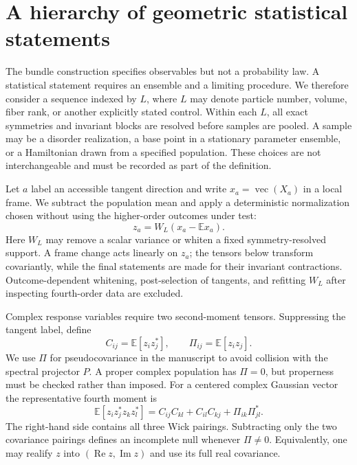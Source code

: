 \section{A hierarchy of geometric statistical statements}
\label{sec:geometric_eth_ansatz}

The bundle construction specifies observables but not a probability law.  A
statistical statement requires an ensemble and a limiting procedure.  We
therefore consider a sequence indexed by $L$, where $L$ may denote particle
number, volume, fiber rank, or another explicitly stated control.  Within
each $L$, all exact symmetries and invariant blocks are resolved before
samples are pooled.  A sample may be a disorder realization, a base point in
a stationary parameter ensemble, or a Hamiltonian drawn from a specified
population.  These choices are not interchangeable and must be recorded as
part of the definition.

Let $a$ label an accessible tangent direction and write
$x_a=\operatorname{vec}(X_a)$ in a local frame.  We subtract the population
mean and apply a deterministic normalization chosen without using the
higher-order outcomes under test:
\begin{equation}
 z_a=W_L\left(x_a-\mathbb E x_a\right).
 \label{eq:normalized_response}
\end{equation}
Here $W_L$ may remove a scalar variance or whiten a fixed symmetry-resolved
support.  A frame change acts linearly on $z_a$; the tensors below transform
covariantly, while the final statements are made for their invariant
contractions.  Outcome-dependent whitening, post-selection of tangents, and
refitting $W_L$ after inspecting fourth-order data are excluded.

Complex response variables require two second-moment tensors.  Suppressing
the tangent label, define
\begin{equation}
 C_{ij}=\mathbb E[z_i z_j^*],
 \qquad
 \Pi_{ij}=\mathbb E[z_i z_j].
 \label{eq:covariance_pseudocovariance}
\end{equation}
We use $\Pi$ for pseudocovariance in the manuscript to avoid collision with
the spectral projector $P$.  A proper complex population has $\Pi=0$, but
properness must be checked rather than imposed.  For a centered complex
Gaussian vector the representative fourth moment is
\begin{equation}
 \mathbb E[z_i z_j^*z_k z_l^*]
 =C_{ij}C_{kl}+C_{il}C_{kj}+\Pi_{ik}\Pi_{jl}^* .
 \label{eq:three_wick_pairings}
\end{equation}
The right-hand side contains all three Wick pairings.  Subtracting only the
two covariance pairings defines an incomplete null whenever $\Pi\ne0$.
Equivalently, one may realify $z$ into $(\operatorname{Re}z,
\operatorname{Im}z)$ and use its full real covariance.

